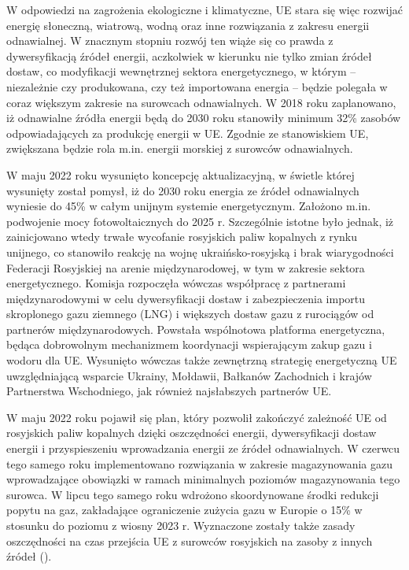 \documentclass[polish, twoside, 12pt, a4paper]{article}
\theoremstyle{definition}
\theoremstyle{plain}
\theoremstyle{remark}
\begin{document}
W odpowiedzi na zagrożenia ekologiczne i klimatyczne, UE stara się więc rozwijać energię słoneczną, wiatrową, wodną oraz inne rozwiązania z zakresu energii odnawialnej. W znacznym stopniu rozwój ten wiąże się co prawda z dywersyfikacją źródeł energii, aczkolwiek w kierunku nie tylko zmian źródeł dostaw, co modyfikacji wewnętrznej sektora energetycznego, w którym – niezależnie czy produkowana, czy też importowana energia – będzie polegała w coraz większym zakresie na surowcach odnawialnych. W 2018 roku zaplanowano, iż odnawialne źródła energii będą do 2030 roku stanowiły minimum 32\% zasobów odpowiadających za produkcję energii w UE. Zgodnie ze stanowiskiem UE, zwiększana będzie rola m.in. energii morskiej z surowców odnawialnych. 

W maju 2022 roku wysunięto koncepcję aktualizacyjną, w świetle której wysunięty został pomysł, iż do 2030 roku energia ze źródeł odnawialnych wyniesie do 45\% w całym unijnym systemie energetycznym. Założono m.in. podwojenie mocy fotowoltaicznych do 2025 r. Szczególnie istotne było jednak, iż zainicjowano wtedy trwałe wycofanie rosyjskich paliw kopalnych z rynku unijnego, co stanowiło reakcję na wojnę ukraińsko-rosyjską i brak wiarygodności Federacji Rosyjskiej na arenie międzynarodowej, w tym w zakresie sektora energetycznego. Komisja rozpoczęła wówczas współpracę z partnerami międzynarodowymi w celu dywersyfikacji dostaw i zabezpieczenia importu skroplonego gazu ziemnego (LNG) i większych dostaw gazu z rurociągów od partnerów międzynarodowych. Powstała wspólnotowa platforma energetyczna, będąca dobrowolnym mechanizmem koordynacji wspierającym zakup gazu i wodoru dla UE. Wysunięto wówczas także zewnętrzną strategię energetyczną UE uwzględniającą wsparcie Ukrainy, Mołdawii, Bałkanów Zachodnich i krajów Partnerstwa Wschodniego, jak również najsłabszych partnerów UE.

W maju 2022 roku pojawił się plan, który pozwolił zakończyć zależność UE od rosyjskich paliw kopalnych dzięki oszczędności energii, dywersyfikacji dostaw energii i przyspieszeniu wprowadzania energii ze źródeł odnawialnych. W czerwcu tego samego roku implementowano rozwiązania w zakresie magazynowania gazu wprowadzające obowiązki w ramach minimalnych poziomów magazynowania tego surowca. W lipcu tego samego roku wdrożono skoordynowane środki redukcji popytu na gaz, zakładające ograniczenie zużycia gazu w Europie o 15\% w stosunku do poziomu z wiosny 2023 r. Wyznaczone zostały także zasady oszczędności na czas przejścia UE z surowców rosyjskich na zasoby z innych źródeł (\cite{ep2023}). 
\end{document}

